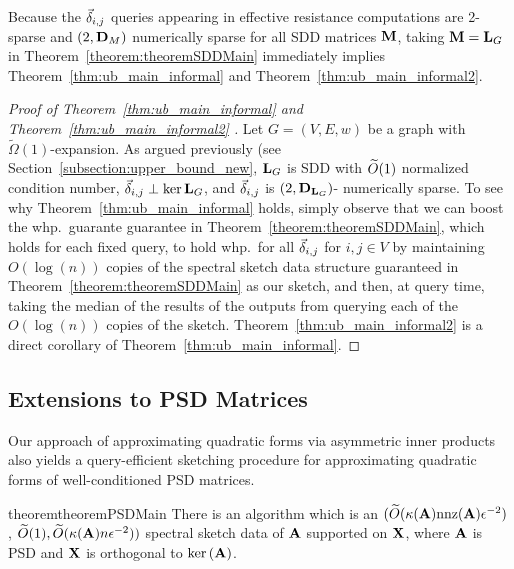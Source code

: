 Because the $\vec{\delta}_{i,j}$ queries appearing in effective resistance computations are 2-sparse and $(2, {\mathbf{D}}_{M})$ numerically sparse for all SDD matrices $\mathbf{M}$, taking $\mathbf{M} = \mathbf{L}_{G}$ in Theorem~\ref{theorem:theoremSDDMain} immediately implies Theorem~\ref{thm:ub_main_informal} and Theorem~\ref{thm:ub_main_informal2}.

\begin{proof}[Proof of Theorem~\ref{thm:ub_main_informal} and Theorem~\ref{thm:ub_main_informal2} ] Let $G = (V, E, w)$ be a graph with $\widetilde{\Omega}(1)$-expansion. As argued previously (see Section~\ref{subsection:upper_bound_new}, $\mathbf{L}_{G}$ is SDD with $\widetilde{O}( {1} )$ normalized condition number, $\vec{\delta}_{i,j} \perp \ker{\mathbf{L}_{G}}$, and $\vec{\delta}_{i,j}$ is $(2, {\mathbf{D}}_{\mathbf{L}_{G}})$- numerically sparse. To see why Theorem~\ref{thm:ub_main_informal} holds, simply observe that we can boost the whp.\ guarante guarantee in Theorem~\ref{theorem:theoremSDDMain}, which holds for each fixed query, to hold whp.\ for all $\vec{\delta}_{i,j}$ for $i, j \in V$ by maintaining $O(\log(n))$ copies of the spectral sketch data structure guaranteed in Theorem~\ref{theorem:theoremSDDMain} as our sketch, and then, at query time, taking the median of the results of the outputs from querying each of the $O(\log(n))$ copies of the sketch. Theorem~\ref{thm:ub_main_informal2} is a direct corollary of Theorem~\ref{thm:ub_main_informal}. 
\end{proof}

\subsection{Extensions to PSD Matrices}\label{section:ub_extensions}

Our approach of approximating quadratic forms via asymmetric inner products also yields a query-efficient sketching procedure for approximating quadratic forms of well-conditioned PSD matrices.

\begin{restatable}{theorem}{theoremPSDMain}\label{theorem:theoremPSDMain} There is an algorithm which is an $(\widetilde{O}( {\kappa(\mathbf{A}) \mathrm{nnz}(\mathbf{A})\epsilon^{-2}} )$, $\widetilde{O}( {1} ), \widetilde{O}( {\kappa(\mathbf{A})n\epsilon^{-2}} ))$ spectral sketch data of $\mathbf{A}$ supported on $\mathbf{X}$, where $\mathbf{A}$ is PSD and $\mathbf{X}$ is orthogonal to $\mathrm{ker}\left(\mathbf{A}\right)$.  
\end{restatable}

